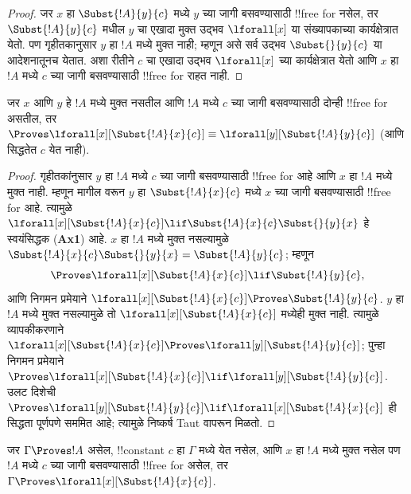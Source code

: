 \documentclass[../../../include/open-logic-section]{subfiles}
\begin{document}
\begin{proof} जर $x$ हा $\Subst{!A}{y}{c}$ मध्ये $y$ च्या जागी
बसवण्यासाठी !!{free for} नसेल, तर $\Subst{!A}{y}{c}$ मधील $y$ चा एखादा
मुक्त उद्भव $\lforall[x]$ या संख्यापकाच्या कार्यक्षेत्रात येतो. पण
गृहीतकानुसार $y$ हा $!A$ मध्ये मुक्त नाही; म्हणून असे सर्व उद्भव
$\Subst{}{y}{c}$ या आदेशनातूनच येतात. अशा रीतीने $c$ चा एखादा
उद्भव $\lforall[x]$ च्या कार्यक्षेत्रात येतो आणि $x$ हा $!A$ मध्ये
$c$ च्या जागी बसवण्यासाठी !!{free for} राहत नाही.
\end{proof}

\begin{lem}[बद्ध चराचा बदल]
जर $x$ आणि $y$ हे $!A$ मध्ये मुक्त नसतील आणि $!A$ मध्ये $c$ च्या जागी
बसवण्यासाठी दोन्ही !!{free for} असतील, तर
$\Proves \lforall[x][\Subst{!A}{x}{c}] \equiv
\lforall[y][\Subst{!A}{y}{c}]$ (आणि सिद्धतेत $c$ येत नाही).
\end{lem}

\begin{proof}
गृहीतकांनुसार $y$ हा $!A$ मध्ये $c$ च्या जागी बसवण्यासाठी !!{free for}
आहे आणि $x$ हा $!A$ मध्ये मुक्त नाही. म्हणून मागील
 वरून $y$ हा $\Subst{!A}{x}{c}$ मध्ये $x$ च्या
जागी बसवण्यासाठी !!{free for} आहे. त्यामुळे
$\lforall[x][\Subst{!A}{x}{c}] \lif \Subst{!A}{x}{c} \Subst{}{y}{x}$
हे स्वयंसिद्धक (\textbf{Ax1}) आहे. $x$ हा $!A$ मध्ये मुक्त नसल्यामुळे
$\Subst{!A}{x}{c} \Subst{}{y}{x} = \Subst{!A}{y}{c}$; म्हणून
\[
\Proves \lforall[x][\Subst{!A}{x}{c}] \lif \Subst{!A}{y}{c},
\]
आणि निगमन प्रमेयाने $\lforall[x][\Subst{!A}{x}{c}] \Proves
\Subst{!A}{y}{c}$. $y$ हा $!A$ मध्ये मुक्त नसल्यामुळे तो
$\lforall[x][\Subst{!A}{x}{c}]$ मध्येही मुक्त नाही. त्यामुळे
व्यापकीकरणाने $\lforall[x][\Subst{!A}{x}{c}] \Proves
\lforall[y][\Subst{!A}{y}{c}]$; पुन्हा निगमन प्रमेयाने
$\Proves \lforall[x][\Subst{!A}{x}{c}] \lif
\lforall[y][\Subst{!A}{y}{c}]$. उलट दिशेची
$\Proves \lforall[y][\Subst{!A}{y}{c}] \lif \lforall[x]
[\Subst{!A}{x}{c}]$ ही सिद्धता पूर्णपणे सममित आहे; त्यामुळे
निष्कर्ष Taut वापरून मिळतो.
\end{proof}

\begin{thm}
जर $\Gamma \Proves !A$ असेल, !!{constant} $c$ हा $\Gamma$ मध्ये येत
नसेल, आणि $x$ हा $!A$ मध्ये मुक्त नसेल पण $!A$ मध्ये $c$ च्या जागी
बसवण्यासाठी !!{free for} असेल, तर
$\Gamma \Proves \lforall[x][\Subst{!A}{x}{c}]$.
\end{thm}
\end{document}
